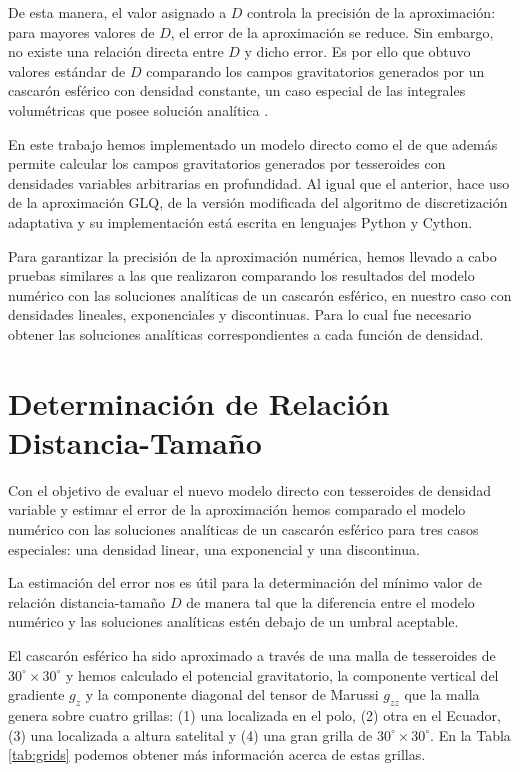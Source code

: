 \documentclass[a4paper,10pt]{article}
\begin{document}
De esta manera, el valor asignado a $D$ controla la precisión de la aproximación: para mayores valores de $D$, el error de la aproximación se reduce.
Sin embargo, no existe una relación directa entre $D$ y dicho error.
Es por ello que \citet{Uieda2016} obtuvo valores estándar de $D$ comparando los campos gravitatorios generados por un cascarón esférico con densidad constante, un caso especial de las integrales volumétricas que posee solución analítica \citep{LaFehr1991, Mikuska2006, Grombein2013}.

En este trabajo hemos implementado un modelo directo como el de \citet{Uieda2016} que además permite calcular los campos gravitatorios generados por tesseroides con densidades variables arbitrarias en profundidad.
Al igual que el anterior, hace uso de la aproximación GLQ, de la versión modificada del algoritmo de discretización adaptativa y su implementación está escrita en lenguajes Python y Cython.

Para garantizar la precisión de la aproximación numérica, hemos llevado a cabo pruebas similares a las que realizaron \citet{Uieda2016} comparando los resultados del modelo numérico con las soluciones analíticas de un cascarón esférico, en nuestro caso con densidades lineales, exponenciales y discontinuas.
Para lo cual fue necesario obtener las soluciones analíticas correspondientes a cada función de densidad.


\section{Determinación de Relación Distancia-Tamaño}

Con el objetivo de evaluar el nuevo modelo directo con tesseroides de densidad variable y estimar el error de la aproximación hemos comparado el modelo numérico con las soluciones analíticas de un cascarón esférico para tres casos especiales: una densidad linear, una exponencial y una discontinua.

La estimación del error nos es útil para la determinación del mínimo valor de relación distancia-tamaño $D$ de manera tal que la diferencia entre el modelo numérico y las soluciones analíticas estén debajo de un umbral aceptable.

El cascarón esférico ha sido aproximado a través de una malla de tesseroides de $30^\circ \times 30^\circ$ y hemos calculado el potencial gravitatorio, la componente vertical del gradiente $g_z$ y la componente diagonal del tensor de Marussi $g_{zz}$ que la malla genera sobre cuatro grillas: (1) una localizada en el polo, (2) otra en el Ecuador, (3) una localizada a altura satelital y (4) una gran grilla de $30^\circ \times 30^\circ$.
En la Tabla \ref{tab:grids} podemos obtener más información acerca de estas grillas.
\end{document}

